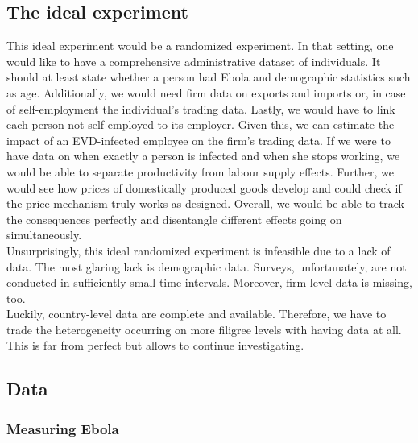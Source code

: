 \documentclass{article}
\begin{document}
\subsection{The ideal experiment}
This ideal experiment would be a randomized experiment. In that setting, one would like to have a comprehensive administrative dataset of individuals. It should at least state whether a person had Ebola and demographic statistics such as age. Additionally, we would need firm data on exports and imports or, in case of self-employment the individual's trading data. Lastly, we would have to link each person not self-employed to its employer. Given this, we can estimate the impact of an EVD-infected employee on the firm's trading data. If we were to have data on when exactly a person is infected and when she stops working, we would be able to separate productivity from labour supply effects. Further, we would see how prices of domestically produced goods develop and could check if the price mechanism truly works as designed. Overall, we would be able to track the consequences perfectly and disentangle different effects going on simultaneously.\\
Unsurprisingly, this ideal randomized experiment is infeasible due to a lack of data. The most glaring lack is demographic data. Surveys, unfortunately, are not conducted in sufficiently small-time intervals. Moreover, firm-level data is missing, too. \\
Luckily, country-level data are complete and available. Therefore, we have to trade the heterogeneity occurring on more filigree levels with having data at all. This is far from perfect but allows to continue investigating.\\

\subsection{Data}

\subsubsection{Measuring Ebola}
\end{document}
